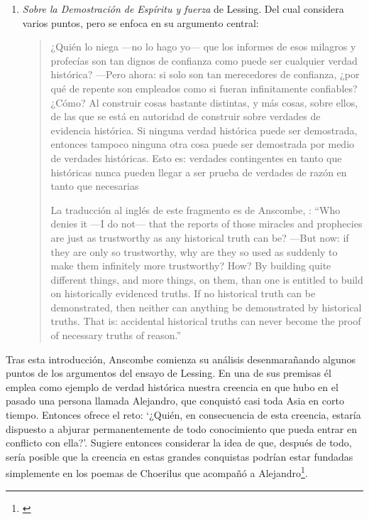 \begin{enumerate}
\item \emph{Sobre la Demostración de Espíritu y fuerza} de Lessing. Del cual considera varios puntos, pero se enfoca en su argumento central: \blockquote[La traducción al inglés de este fragmento es de Anscombe, {\cite[Cf.~][22]{anscombe2008faith:prophandmi}}: \enquote{Who denies it ---I do not--- that the reports of those miracles and prophecies are just as trustworthy as any historical truth can be? ---But now: if they are only so trustworthy, why are they so used as suddenly to make them infinitely more trustworthy? How? By building quite different things, and more things, on them, than one is entitled to build on historically evidenced truths. If no historical truth can be demonstrated, then neither can anything be demonstrated by historical truths. That is: accidental historical truths can never become the proof of necessary truths of reason.}]{¿Quién lo niega ---no lo hago yo--- que los informes de esos milagros y profecías son tan dignos de confianza como puede ser cualquier verdad histórica? ---Pero ahora: si solo son tan merecedores de confianza, ¿por qué de repente son empleados como si fueran infinitamente confiables? ¿Cómo? Al construir cosas bastante distintas, y más cosas, sobre ellos, de las que se está en autoridad de construir sobre verdades de evidencia histórica. Si ninguna verdad histórica puede ser demostrada, entonces tampoco ninguna otra cosa puede ser demostrada por medio de verdades históricas. Esto es: verdades contingentes en tanto que históricas nunca pueden llegar a ser prueba de verdades de razón en tanto que necesarias}.
\end{enumerate}

Tras esta introducción, Anscombe comienza su análisis desenmarañando algunos puntos de los argumentos del ensayo de Lessing. En una de sus premisas él emplea como ejemplo de verdad histórica nuestra creencia en que hubo en el pasado una persona llamada Alejandro, que conquistó casi toda Asia en corto tiempo. Entonces ofrece el reto: \enquote*{¿Quién, en consecuencia de esta creencia, estaría dispuesto a abjurar permanentemente de todo conocimiento que pueda entrar en conflicto con ella?}. Sugiere entonces considerar la idea de que, después de todo, sería posible que la creencia en estas grandes conquistas podrían estar fundadas simplemente en los poemas de Choerilus que acompañó a Alejandro\footnote{\cite[Cf.~][448]{lessing1982escritos:demo}}.

